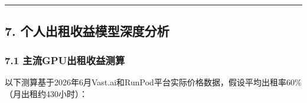\documentclass[UTF8,a4paper,12pt]{ctexart}
\begin{document}
\begin{center}\rule{0.5\linewidth}{0.5pt}\end{center}

\pagebreak

\subsection{7.
个人出租收益模型深度分析}\label{ux4e2aux4ebaux51faux79dfux6536ux76caux6a21ux578bux6df1ux5ea6ux5206ux6790}

\subsubsection{7.1
主流GPU出租收益测算}\label{ux4e3bux6d41gpuux51faux79dfux6536ux76caux6d4bux7b97}

以下测算基于2026年6月Vast.ai和RunPod平台实际价格数据，假设平均出租率60\%（月出租约430小时）：
\end{document}
